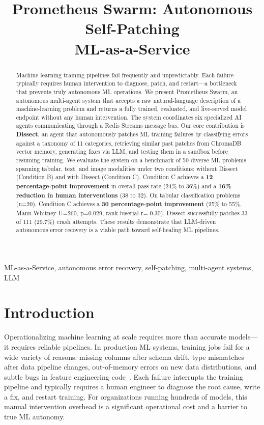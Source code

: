 \documentclass[conference]{IEEEtran}
\title{Prometheus Swarm: Autonomous Self-Patching \\ ML-as-a-Service}
\author{
  \IEEEauthorblockN{Mohamed Mosad Ghonaim}
  \IEEEauthorblockA{
    Alamein International University --- Nexora Lab\\
    Email: mohamed.ghonaim@nexoralab.ai
  }
}
\begin{document}
\maketitle

\begin{abstract}
Machine learning training pipelines fail frequently and unpredictably. Each failure
typically requires human intervention to diagnose, patch, and restart---a bottleneck
that prevents truly autonomous ML operations. We present Prometheus Swarm, an autonomous
multi-agent system that accepts a raw natural-language description of a machine-learning
problem and returns a fully trained, evaluated, and live-served model endpoint without
any human intervention. The system coordinates six specialized AI agents communicating
through a Redis Streams message bus. Our core contribution is \textbf{Dissect}, an agent that
autonomously patches ML training failures by classifying errors against a taxonomy of
11 categories, retrieving similar past patches from ChromaDB vector memory, generating
fixes via LLM, and testing them in a sandbox before resuming training. We evaluate the
system on a benchmark of 50 diverse ML problems spanning tabular, text, and image
modalities under two conditions: without Dissect (Condition B) and with Dissect
(Condition C). Condition C achieves a \textbf{12 percentage-point improvement} in overall
pass rate (24\% to 36\%) and a \textbf{16\% reduction in human interventions} (38 to 32).
On tabular classification problems (n=20), Condition C achieves a \textbf{30
percentage-point improvement} (25\% to 55\%, Mann-Whitney U=260, p=0.029, rank-biserial
r=-0.30). Dissect successfully patches 33 of 111 (29.7\%) crash attempts. These results
demonstrate that LLM-driven autonomous error recovery is a viable path toward
self-healing ML pipelines.
\end{abstract}

\begin{IEEEkeywords}
ML-as-a-Service, autonomous error recovery, self-patching, multi-agent systems, LLM
\end{IEEEkeywords}

\section{Introduction}

Operationalizing machine learning at scale requires more than accurate models---it
requires reliable pipelines. In production ML systems, training jobs fail for a wide
variety of reasons: missing columns after schema drift, type mismatches after data
pipeline changes, out-of-memory errors on new data distributions, and subtle bugs in
feature engineering code~\cite{sculley2015hidden, polyzotis2018data}. Each failure
interrupts the training pipeline and typically requires a human engineer to diagnose the
root cause, write a fix, and restart training. For organizations running hundreds of
models, this manual intervention overhead is a significant operational cost and a barrier
to true ML autonomy.
\end{document}
